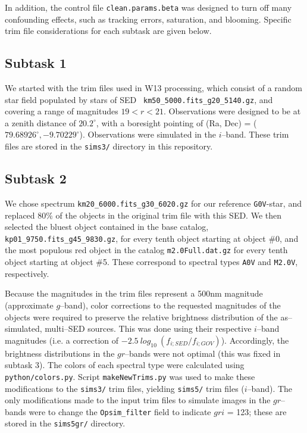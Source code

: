 \documentclass[prd, nofootinbib, floatfix, 11pt, tightenlines, times]{article}
\begin{document}
\begin{appendices}
In addition, the control file {\tt clean.params.beta} was designed to
turn off many confounding effects, such as tracking errors,
saturation, and blooming.  Specific trim file considerations for each
subtask are given below.

\subsection{Subtask 1}

We started with the trim files used in W13 processing, which consist
of a random star field populated by stars of SED {\tt
  km50\_5000.fits\_g20\_5140.gz}, and covering a range of magnitudes
$19 < r < 21$.  Observations were designed to be at a zenith distance
of $20.2^{\circ}$, with a boresight pointing of (Ra, Dec) =
($79.68926^{\circ}, -9.70229^{\circ}$).  Observations were simulated
in the $i$--band.  These trim files are stored in the {\tt sims3/}
directory in this repository.

\subsection{Subtask 2}

We chose spectrum {\tt km20\_6000.fits\_g30\_6020.gz} for our
reference {\tt G0V}-star, and replaced 80\% of the objects in the
original trim file with this SED.  We then selected the bluest object
contained in the base catalog, {\tt kp01\_9750.fits\_g45\_9830.gz},
for every tenth object starting at object \#0, and the most populous
red object in the catalog {\tt m2.0Full.dat.gz} for every tenth object
starting at object \#5.  These correspond to spectral types {\tt A0V}
and {\tt M2.0V}, respectively.  

Because the magnitudes in the trim files represent a 500nm magnitude
(approximate $g$--band), color corrections to the requested magnitudes
of the objects were required to preserve the relative brightness
distribution of the as--simulated, multi--SED sources.  This was done
using their respective $i$--band magnitudes (i.e. a correction of
$-2.5~log_{10}~( f_{i;SED} / f_{i;GOV} )$).  Accordingly, the
brightness distributions in the $gr$--bands were not optimal (this was
fixed in subtask 3).  The colors of each spectral type were calculated
using {\tt python/colors.py}.  Script {\tt makeNewTrims.py} was used
to make these modifications to the {\tt sims3/} trim files, yielding
{\tt sims5/} trim files ($i$--band).  The only modifications made to
the input trim files to simulate images in the $gr$--bands were to
change the {\tt Opsim\_filter} field to indicate $gri$ = 123; these
are stored in the {\tt sims5gr/} directory.


\end{appendices}
\end{document}
